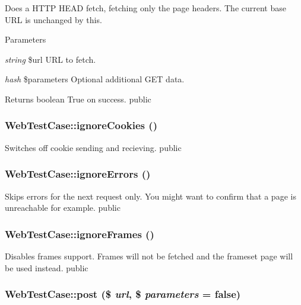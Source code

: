 \label{class_web_test_case_af774376bbbcf017378dbec675015a760}
Does a HTTP HEAD fetch, fetching only the page headers. The current base URL is unchanged by this. 
\begin{DoxyParams}{Parameters}
\item[{\em string}]\$url URL to fetch. \item[{\em hash}]\$parameters Optional additional GET data. \end{DoxyParams}
\begin{DoxyReturn}{Returns}
boolean True on success.  public 
\end{DoxyReturn}
\hypertarget{class_web_test_case_a0f36074331d50bcc7ea4bfe1c522f130}{
\subsubsection[{ignoreCookies}]{\setlength{\rightskip}{0pt plus 5cm}WebTestCase::ignoreCookies ()}}
\label{class_web_test_case_a0f36074331d50bcc7ea4bfe1c522f130}
Switches off cookie sending and recieving.  public \hypertarget{class_web_test_case_a6aface34c4d09b7340bda88c72468056}{
\subsubsection[{ignoreErrors}]{\setlength{\rightskip}{0pt plus 5cm}WebTestCase::ignoreErrors ()}}
\label{class_web_test_case_a6aface34c4d09b7340bda88c72468056}
Skips errors for the next request only. You might want to confirm that a page is unreachable for example.  public \hypertarget{class_web_test_case_a3fb48ba6173cf132a26a3695f2e43df3}{
\subsubsection[{ignoreFrames}]{\setlength{\rightskip}{0pt plus 5cm}WebTestCase::ignoreFrames ()}}
\label{class_web_test_case_a3fb48ba6173cf132a26a3695f2e43df3}
Disables frames support. Frames will not be fetched and the frameset page will be used instead.  public \hypertarget{class_web_test_case_a7d409a4e22876ab2b96ee330c0bedc8c}{
\subsubsection[{post}]{\setlength{\rightskip}{0pt plus 5cm}WebTestCase::post (\$ {\em url}, \/  \$ {\em parameters} = {\ttfamily false})}}
